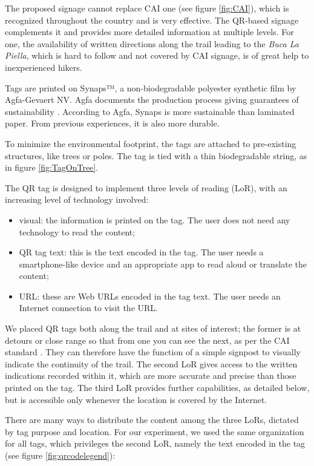 \documentclass[sustainability,article,submit,pdftex,moreauthors]{Definitions/mdpi}
\begin{document}
The proposed signage cannot replace CAI one (see figure \ref{fig:CAI}), which is recognized throughout the country and is very effective. The QR-based signage complements it and provides more detailed information at multiple levels. For one, the availability of written directions along the trail leading to the \textit{Buca La Piella}, which is hard to follow and not covered by CAI signage, is of great help to inexperienced hikers.

Tags are printed on Synaps™, a non-biodegradable polyester synthetic film by Agfa-Gevaert NV. Agfa documents the production process giving guarantees of sustainability . According to Agfa, Synaps is more sustainable than laminated paper. From previous experiences, it is also more durable.

To minimize the environmental footprint, the tags are attached to pre-existing structures, like trees or poles. The tag is tied with a thin biodegradable string, as in figure \ref{fig:TagOnTree}.

The QR tag is designed to implement three levels of reading (LoR), with an increasing level of technology involved:
\begin{itemize}
    \item visual: the information is printed on the tag. The user does not need any technology to read the content;
    \item QR tag text: this is the text encoded in the tag. The user needs a smartphone-like device and an appropriate app to read aloud or translate the content;
    \item URL: these are Web URLs encoded in the tag text. The user needs an Internet connection to visit the URL.
\end{itemize}

We placed QR tags both along the trail and at sites of interest; the former is at detours or close range so that from one you can see the next, as per the CAI standard \cite{cai10}. They can therefore have the function of a simple signpost to visually indicate the continuity of the trail. The second LoR gives access to the written indications recorded within it, which are more accurate and precise than those printed on the tag. The third LoR provides further capabilities, as detailed below, but is accessible only whenever the location is covered by the Internet. 

There are many ways to distribute the content among the three LoRs, dictated by tag purpose and location. For our experiment, we used the same organization for all tags, which privileges the second LoR, namely the text encoded in the tag (see figure \ref{fig:qrcodelegend}): 
\end{document}
